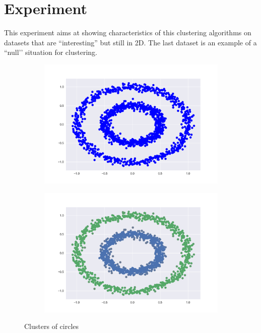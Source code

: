 \documentclass{article}
\begin{document}
	\section{Experiment}
	
	This experiment aims at showing characteristics of this clustering algorithms on datasets that are ``interesting'' but still in 2D. The last dataset is an example of a ``null’' situation for clustering.
	
	\begin{figure}[h!]
		\begin{subfigure}{.5\textwidth}
			\centering
			\includegraphics[width=\linewidth]{c_figure_1.png}
			\caption{}
		\end{subfigure}%
		\begin{subfigure}{.5\textwidth}
			\centering
			\includegraphics[width=\linewidth]{c_figure_2.png}
			\caption{}
		\end{subfigure}
		\caption{Clusters of circles}
	\end{figure}
	
\end{document}
